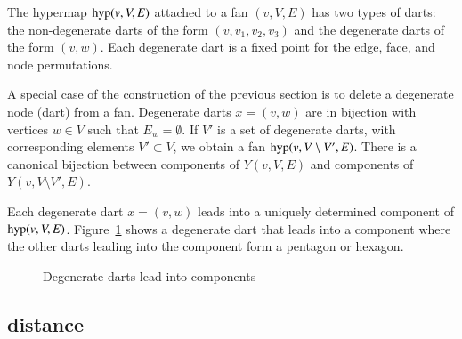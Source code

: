 The hypermap ${\operatorname{hyp}}(v,V,E)$ attached to a fan $(v,V,E)$
has two types of darts: the non-degenerate darts of the form
$(v,v_1,v_2,v_3)$ and the degenerate darts of the form $(v,w)$.
Each degenerate dart is a  fixed point for the edge, face, and node
permutations.

A special case of the construction of the previous section
is to delete a degenerate node (dart) from a fan.
Degenerate darts $x=(v,w)$ are in bijection with vertices
$w\in V$ such that $E_w = \emptyset$.
If $V'$ is a set of degenerate darts, with corresponding elements
$V'\subset V$, 
we obtain a fan
${\operatorname{hyp}}(v,V\setminus V',E)$.  There is a canonical bijection
between components of $Y(v,V,E)$ and components of $Y(v,V\setminus V',E)$.

Each degenerate dart $x=(v,w)$ leads into a uniquely determined
component of ${\operatorname{hyp}}(v,V,E)$.  
Figure~\ref{fig:deg-pent-hex} %
shows a degenerate dart that leads into a component where
the other darts leading into the component form a pentagon
or hexagon.

\begin{figure}[htb]
  \centering
  \caption{Degenerate darts lead into components} %
  \label{fig:deg-pent-hex}
\end{figure}


\subsection{distance}


